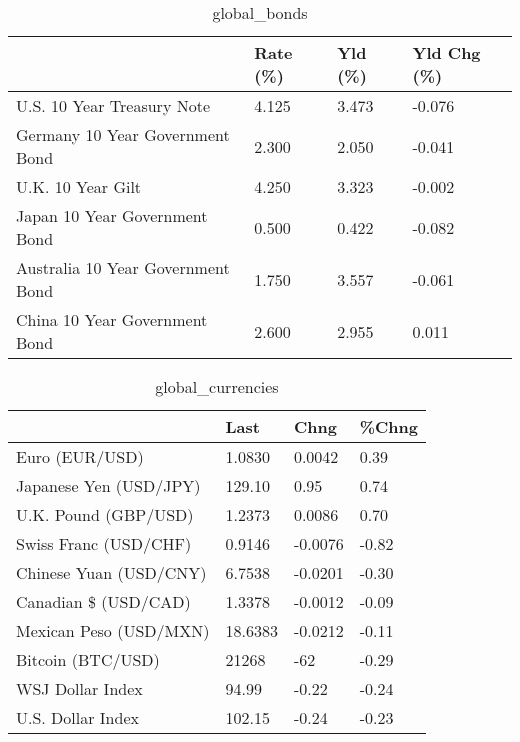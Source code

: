 \documentclass{article}%
\begin{document}
%


\begin{table}[htbp]%
\caption{global\_bonds}%
\centering%
\begin{adjustbox}{width=1\textwidth}%
\begin{tabular}{llll}
\toprule
                                  & Rate (\%) & Yld (\%) & Yld Chg (\%) \\
\midrule
       U.S. 10 Year Treasury Note &    4.125 &   3.473 &      -0.076 \\
  Germany 10 Year Government Bond &    2.300 &   2.050 &      -0.041 \\
                U.K. 10 Year Gilt &    4.250 &   3.323 &      -0.002 \\
    Japan 10 Year Government Bond &    0.500 &   0.422 &      -0.082 \\
Australia 10 Year Government Bond &    1.750 &   3.557 &      -0.061 \\
    China 10 Year Government Bond &    2.600 &   2.955 &       0.011 \\
\bottomrule
\end{tabular}
%
\end{adjustbox}%
\end{table}

%


\begin{table}[htbp]%
\caption{global\_currencies}%
\centering%
\begin{adjustbox}{width=1\textwidth}%
\begin{tabular}{llll}
\toprule
                       &    Last &    Chng & \%Chng \\
\midrule
        Euro (EUR/USD) &  1.0830 &  0.0042 &  0.39 \\
Japanese Yen (USD/JPY) &  129.10 &    0.95 &  0.74 \\
  U.K. Pound (GBP/USD) &  1.2373 &  0.0086 &  0.70 \\
 Swiss Franc (USD/CHF) &  0.9146 & -0.0076 & -0.82 \\
Chinese Yuan (USD/CNY) &  6.7538 & -0.0201 & -0.30 \\
  Canadian \$ (USD/CAD) &  1.3378 & -0.0012 & -0.09 \\
Mexican Peso (USD/MXN) & 18.6383 & -0.0212 & -0.11 \\
     Bitcoin (BTC/USD) &   21268 &     -62 & -0.29 \\
      WSJ Dollar Index &   94.99 &   -0.22 & -0.24 \\
     U.S. Dollar Index &  102.15 &   -0.24 & -0.23 \\
\bottomrule
\end{tabular}
%
\end{adjustbox}%
\end{table}
\end{document}
